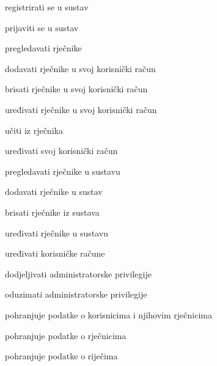 			
			\begin{packed_enum}
				\item  {}
				
				\begin{packed_enum}
					\item registrirati se u sustav
					\item prijaviti se u sustav
				\end{packed_enum}

				
			
				\item  {}
				
				\begin{packed_enum}
					\item pregledavati rječnike
					\item dodavati rječnike u svoj korisnički račun
					\item brisati rječnike u svoj korisnički račun
					\item uređivati rječnike u svoj korisnički račun
					\item učiti iz rječnika
					\item uređivati svoj korisnički račun
					
				\end{packed_enum}

				\item {}
				\begin{packed_enum}
					\item pregledavati rječnike u sustavu
					\item dodavati rječnike u sustav
					\item brisati rječnike iz sustava
					\item uređivati rječnike u sustavu
					\item uređivati korisničke račune
					\item dodjeljivati administratorske privilegije
					\item oduzimati administratorske privilegije
				\end{packed_enum}

				\pagebreak

				\item {}
				\begin{packed_enum}
					\item pohranjuje podatke o korisnicima i njihovim rječnicima
					\item pohranjuje podatke o rječnicima
					\item pohranjuje podatke o riječima
				\end{packed_enum}
				

\end{packed_enum}
